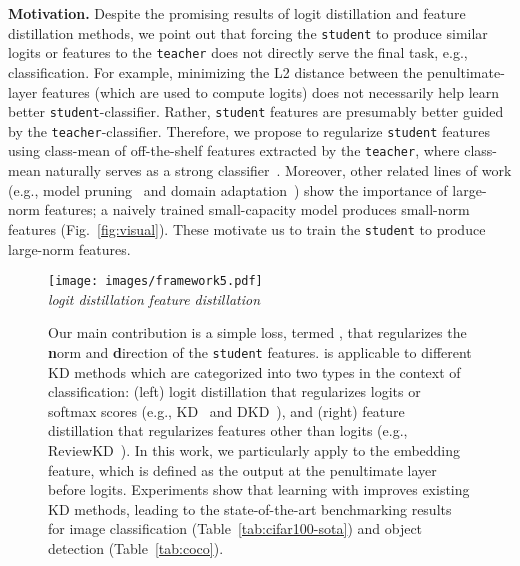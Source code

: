 \documentclass{article}
\begin{document}
{\bf Motivation.}
Despite the promising results of logit distillation and feature distillation methods, we point out that forcing the {\tt student} to produce similar logits or features to the {\tt teacher} does not directly serve the final task, e.g., classification.
For example, minimizing the L2 distance between the penultimate-layer features (which are used to compute logits) does not necessarily help learn better {\tt student}-classifier. 
Rather, {\tt student} features are presumably better guided by the {\tt teacher}-classifier.
Therefore, we propose to regularize {\tt student} features using class-mean of off-the-shelf features extracted by the {\tt teacher},
where class-mean naturally serves as a strong classifier~\cite{donahue2014decaf, sharif2014cnn, kong2021opengan}.
Moreover, 
other related lines of work (e.g., model pruning~\cite{ye2018rethinking} and domain adaptation~\cite{xu2019larger}) show the importance of large-norm features; a naively trained small-capacity model produces small-norm features (Fig.~\ref{fig:visual}).
These motivate us to train the {\tt student} to produce large-norm features.














\begin{figure}[t]
\centering
\texttt{[image: images/framework5.pdf]}
    \\
    \vspace{-3mm}
    {\em logit distillation} \hspace{50mm} {\em feature distillation}
\caption{\small
Our main contribution is a simple loss, termed , that regularizes the {\bf n}orm and {\bf d}irection of the {\tt student} features.
 is applicable to different KD methods which are categorized into two types in the context of classification: (left) logit distillation that regularizes logits or softmax scores (e.g., KD~\cite{hinton2015distilling}
and DKD~\cite{zhao2022decoupled}),
and (right) feature distillation that regularizes features other than logits (e.g., ReviewKD~\cite{chen2021distilling}).
In this work, we particularly apply  to the embedding feature, which is defined as the output at the penultimate layer before logits. 
Experiments show that learning with  improves  existing KD methods, leading to the state-of-the-art benchmarking results for image classification (Table~\ref{tab:cifar100-sota}) and object detection (Table~\ref{tab:coco}).
}
\vspace{-8mm}
\label{fig:framwork}
\end{figure}
\end{document}
